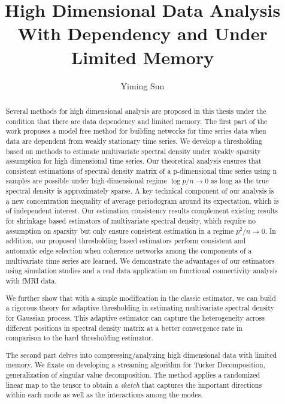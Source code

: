 \documentclass[phd,tocprelim]{cornell}
\title {High Dimensional Data Analysis With Dependency and Under Limited Memory}
\author {Yiming Sun}
\numberwithin{equation}{section}
\begin{document}
\maketitle

\makecopyright

\begin{abstract}
	Several methods for high dimensional analysis are proposed  in this thesis under the condition that there are data dependency and limited memory. The first part of the work proposes a model free method for building networks for time series data when data are dependent from weakly stationary time series. We develop a thresholding based on methods to estimate multivariate spectral density under weakly sparsity assumption for high dimensional time series.
	Our theoretical analysis ensures that consistent estimations of spectral density matrix of a p-dimensional time series using n samples
	are possible under high-dimensional regime $\log p/n \rightarrow 0$ as long as the true spectral density is approximately sparse. A key technical component of our analysis is a new concentration inequality of
	average periodogram around its expectation, which is of independent interest. Our estimation consistency results complement existing results for shrinkage based estimators of multivariate spectral
	density, which require no assumption on sparsity but only ensure consistent estimation in a regime
	$p^2/n \rightarrow 0$. In addition, our proposed thresholding based estimators perform consistent and automatic
	edge selection when coherence networks among the components of a multivariate time series are learned.
	We demonstrate the advantages of our estimators using simulation studies and a real data application
	on functional connectivity analysis with fMRI data. \par 
	We further show that with a simple modification in the classic estimator, we can build a rigorous theory for adaptive thresholding in estimating multivariate spectral density for Gaussian process. This adaptive estimator can capture the heterogeneity across different positions in spectral density matrix at a better convergence rate in comparison to the hard thresholding estimator.   \par 
	The second part delves into compressing/analyzing high dimensional data with limited memory. We fixate on developing a streaming algorithm for Tucker Decomposition, generalization of singular value decomposition. The method applies a randomized linear map to the tensor to obtain a \emph{sketch}
	that captures the important directions within each mode as well as the interactions among the modes.

\end{abstract}
\end{document}
